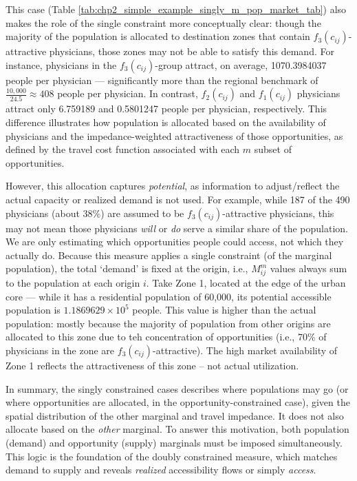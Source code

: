\documentclass[
11pt, %
oneside, %
english, %
singlespacing, %
]{macthesis} %
\begin{document}


This case (Table \ref{tab:chp2_simple_example_singly_m_pop_market_tab}) also makes the role of the single constraint more conceptually clear: though the majority of the population is allocated to destination zones that contain \(f_3(c_{ij})\)-attractive physicians, those zones may not be able to satisfy this demand. For instance, physicians in the \(f_3(c_{ij})\)-group attract, on average, 1070.3984037 people per physician --- significantly more than the regional benchmark of \(\frac{10,000}{24.5} \approx 408\) people per physician. In contrast, \(f_2(c_{ij})\) and \(f_1(c_{ij})\) physicians attract only 6.759189 and 0.5801247 people per physician, respectively. This difference illustrates how population is allocated based on the availability of physicians and the impedance-weighted attractiveness of those opportunities, as defined by the travel cost function associated with each \(m\) subset of opportunities.

However, this allocation captures \emph{potential}, as information to adjust/reflect the actual capacity or realized demand is not used. For example, while 187 of the 490 physicians (about 38\%) are assumed to be \(f_3(c_{ij})\)-attractive physicians, this may not mean those physicians \emph{will} or \emph{do} serve a similar share of the population. We are only estimating which opportunities people could access, not which they actually do. Because this measure applies a single constraint (of the marginal population), the total `demand' is fixed at the origin, i.e., \(M_{ij}^m\) values always sum to the population at each origin \(i\). Take Zone 1, located at the edge of the urban core --- while it has a residential population of 60,000, its potential accessible population is \ensuremath{1.1869629\times 10^{5}} people. This value is higher than the actual population: mostly because the majority of population from other origins are allocated to this zone due to teh concentration of opportunities (i.e., 70\% of physicians in the zone are \(f_3(c_{ij})\)-attractive). The high market availability of Zone 1 reflects the attractiveness of this zone -- not actual utilization.

In summary, the singly constrained cases describes where populations may go (or where opportunities are allocated, in the opportunity-constrained case), given the spatial distribution of the other marginal and travel impedance. It does not also allocate based on the \emph{other} marginal. To answer this motivation, both population (demand) and opportunity (supply) marginals must be imposed simultaneously. This logic is the foundation of the doubly constrained measure, which matches demand to supply and reveals \emph{realized} accessibility flows or simply \emph{access}.
\end{document}
